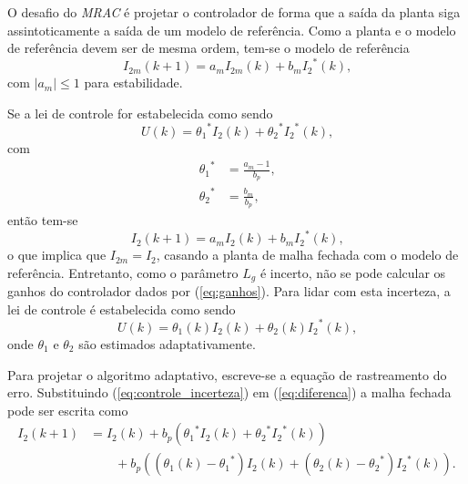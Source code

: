   O desafio do \emph{MRAC} é projetar o controlador de forma que a saída da planta siga assintoticamente a saída de um modelo de referência. Como a planta e o modelo de referência devem ser de mesma ordem, tem-se o modelo de referência
  \begin{equation}
    I_{2m}(k + 1) = a_m I_{2m}(k) + b_m {I_2}^* (k) \text{,}
    \label{eq:modelo_referencia}
  \end{equation}
  com $| a_m | \le 1$ para estabilidade.

  Se a lei de controle for estabelecida como sendo
  \begin{equation}
    U (k) = {\theta_1}^* I_2 (k) + {\theta_2}^* {I_2}^* (k) \text{,}
  \end{equation}
  com
  \begin{equation}
    \begin{split}
      {\theta_1}^* & = \frac{a_m - 1}{b_p} \text{,}\\
      {\theta_2}^* & = \frac{b_m}{b_p} \text{,}
    \end{split}
    \label{eq:ganhos}
  \end{equation}
  então tem-se
  \begin{equation}
    I_2 (k + 1) = a_m I_2 (k) + b_m {I_2}^* (k) \text{,}
  \end{equation}
  o que implica que $I_{2m} = I_2$, casando a planta de malha fechada com o modelo de referência. Entretanto, como o parâmetro $L_g$ é incerto, não se pode calcular os ganhos do controlador dados por (\ref{eq:ganhos}). Para lidar com esta incerteza, a lei de controle é estabelecida como sendo
  \begin{equation}
    U (k) = \theta_1 (k) I_2 (k) + \theta_2 (k) {I_2}^* (k) \text{,}
    \label{eq:controle_incerteza}
  \end{equation}
  onde $\theta_1$ e $\theta_2$ são estimados adaptativamente.

  Para projetar o algoritmo adaptativo, escreve-se a equação de rastreamento do erro. Substituindo (\ref{eq:controle_incerteza}) em (\ref{eq:diferenca}) a malha fechada pode ser escrita como
  \begin{equation}
    \begin{split}
      I_2 (k + 1) &= I_2 (k) + b_p \left( {\theta_1}^* I_2 (k) + {\theta_2}^* {I_2}^*
      (k) \right)\\
      &\qquad {}+ b_p \left( (\theta_1 (k) - {\theta_1}^*) I_2 (k) + ( \theta_2 (k)
      - {\theta_2}^*) {I_2}^* (k) \right) \text{.}
    \end{split}
    \label{eq:malha_fechada}
  \end{equation}


